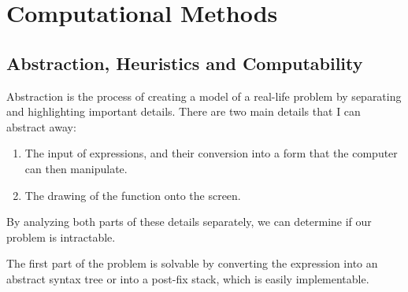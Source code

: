 \documentclass[../../../main.tex]{subfiles}
\begin{document}
\chapter{Computational Methods}

\section{Abstraction, Heuristics and Computability}\label{sec:computability}
Abstraction is the process of creating a model of a real-life problem by separating and highlighting important details. There are two main details that I can abstract away:
\begin{enumerate}
\item The input of expressions, and their conversion into a form that the computer can then manipulate.
\item The drawing of the function onto the screen.
\end{enumerate}
By analyzing both parts of these details separately, we can determine if our problem is intractable.

The first part of the problem is solvable by converting the expression into an abstract syntax tree or into a post-fix stack, which is easily implementable.
\end{document}
